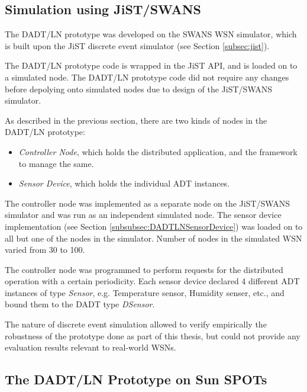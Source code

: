 \subsection{Simulation using JiST/SWANS}

The DADT/LN prototype was developed on the SWANS WSN simulator, which is built
upon the JiST discrete event simulator (see Section \ref{subsec:jist}). 

The DADT/LN prototype code is wrapped in the JiST API, and is loaded on to a
simulated node. 
The DADT/LN prototype code did not require any changes before depolying
onto simulated nodes due to design of the JiST/SWANS simulator.

As described in the previous section, there are two kinds of
nodes in the DADT/LN prototype:

\begin{itemize}
  \item \emph{Controller Node}, which holds the distributed application, and the
  framework to manage the same.
  \item \emph{Sensor Device}, which holds the individual ADT instances. 
\end{itemize}

The controller node was implemented as a separate node on the JiST/SWANS
simulator and was run as an independent simulated node. The sensor device
implementation (see Section \ref{subsubsec:DADTLNSensorDevice}) was loaded on to all but one of the nodes in
the simulator. Number of nodes in the simulated WSN varied from 30 to 100. 

The controller node was programmed to perform requests for the
distributed operation with a certain periodicity. 
Each sensor device declared 4 different ADT instances of type \emph{Sensor},
e.g. Temperature sensor, Humidity senser, etc., and bound them to the DADT type
\emph{DSensor}. 

The nature of discrete event simulation allowed to verify empirically the
robustness of the prototype done as part of this thesis, but could not provide any evaluation
results relevant to real-world WSNs.


\subsection{The DADT/LN Prototype on Sun SPOTs}

